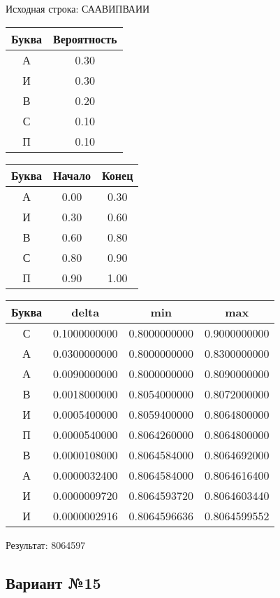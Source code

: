 \documentclass[a4paper, 12pt]{article}
\begin{document}
Исходная строка: СААВИПВАИИ\
\begin{center}
 \begin{tabular}{ |c|c| } 
  \hline
     Буква & Вероятность \\ \hline
А & 0.30\\\hline
И & 0.30\\\hline
В & 0.20\\\hline
С & 0.10\\\hline
П & 0.10
\\ \hline \end{tabular}
\end{center}
\begin{center}
 \begin{tabular}{ |c|c|c| } 
  \hline
     Буква & Начало & Конец \\ \hline
А & 0.00 & 0.30\\\hline
И & 0.30 & 0.60\\\hline
В & 0.60 & 0.80\\\hline
С & 0.80 & 0.90\\\hline
П & 0.90 & 1.00
\\ \hline \end{tabular}
\end{center}
\begin{center}
 \begin{tabular}{ |c|c|c|c| } 
  \hline
     Буква & delta & min & max \\ \hline
С & 0.1000000000 & 0.8000000000 & 0.9000000000\\\hline
А & 0.0300000000 & 0.8000000000 & 0.8300000000\\\hline
А & 0.0090000000 & 0.8000000000 & 0.8090000000\\\hline
В & 0.0018000000 & 0.8054000000 & 0.8072000000\\\hline
И & 0.0005400000 & 0.8059400000 & 0.8064800000\\\hline
П & 0.0000540000 & 0.8064260000 & 0.8064800000\\\hline
В & 0.0000108000 & 0.8064584000 & 0.8064692000\\\hline
А & 0.0000032400 & 0.8064584000 & 0.8064616400\\\hline
И & 0.0000009720 & 0.8064593720 & 0.8064603440\\\hline
И & 0.0000002916 & 0.8064596636 & 0.8064599552
\\ \hline \end{tabular}
\end{center}
Результат: 8064597
\pagebreak
\subsection{Вариант №15}
\end{document}
